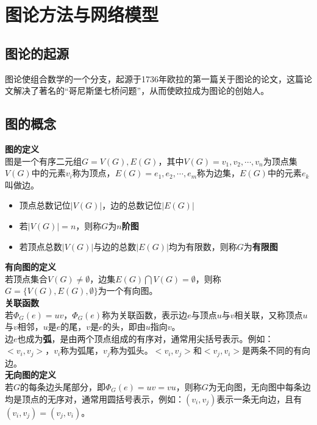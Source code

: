 \documentclass[openany]{progbookcn}
\begin{document}
\section{图论方法与网络模型}
\subsection{图论的起源}
图论使组合数学的一个分支，起源于1736年欧拉的第一篇关于图论的论文，这篇论文解决了著名的“哥尼斯堡七桥问题”，从而使欧拉成为图论的创始人。
\subsection{图的概念}
\noindent \textbf{图的定义}\\
\indent 图是一个有序二元组$G={V(G),E(G)}$，其中$V(G)={v_1,v_2,\cdots,v_n}$为顶点集$V(G)$中的元素$v_i$称为顶点，$E(G)={e_1,e_2,\cdots,e_m}$称为边集，$E(G)$中的元素$e_k$叫做边。
\begin{itemize}
\item 顶点总数记位$|V(G)|$，边的总数记位$|E(G)|$
\item 若$|V(G)|=n$，则称$G$为{\bf $n$阶图}
\item 若顶点总数$|V(G)|$与边的总数$|E(G)|$均为有限数，则称$G$为\bf {有限图}
\end{itemize}
\noindent \textbf{有向图的定义}\\
\indent 若顶点集合$V(G)\neq \emptyset$，边集$E(G)\bigcap V(G)=\emptyset$，则称$G=\{V(G),E(G),\emptyset\}$为一个有向图。\\
\noindent \textbf{关联函数}\\
\indent 若$\Phi_G(e)=uv$，$\Phi_G(e)$称为关联函数，表示边$e$与顶点$u$与$v$相关联，又称顶点$u$与$v$相邻，$u$是$e$的尾，$v$是$e$的头，即由$u$指向$v$。\\
\indent 边$e$也成为{\bf 弧}，是由两个顶点组成的有序对，通常用尖括号表示。例如：$<v_i,v_j>$，$v_i$称为弧尾，$v_j$称为弧头。$<v_i,v_j>$和$<v_j,v_i>$是两条不同的有向边。\\
\noindent \textbf{无向图的定义}\\
\indent 若$G$的每条边头尾部分，即$\Phi_G(e)=uv=vu$，则称$G$为无向图，无向图中每条边均是顶点的无序对，通常用圆括号表示，例如：$(v_i,v_j)$表示一条无向边，且有$(v_i,v_j)=(v_j,v_i)$。
\end{document}
